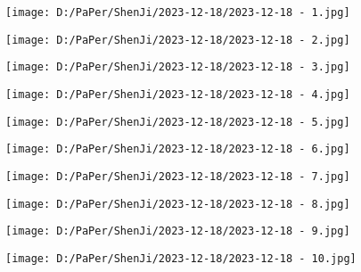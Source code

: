 \documentclass{article}
\begin{document}
\begin{figure}[h!]
	\centering
	\texttt{[image: D:/PaPer/ShenJi/2023-12-18/2023-12-18 - 1.jpg]}
\end{figure}

\begin{figure}[h!]
	\centering
	\texttt{[image: D:/PaPer/ShenJi/2023-12-18/2023-12-18 - 2.jpg]}
\end{figure}

\begin{figure}[h!]
	\centering
	\texttt{[image: D:/PaPer/ShenJi/2023-12-18/2023-12-18 - 3.jpg]}
\end{figure}

\begin{figure}[h!]
	\centering
	\texttt{[image: D:/PaPer/ShenJi/2023-12-18/2023-12-18 - 4.jpg]}
\end{figure}

\begin{figure}[h!]
	\centering
	\texttt{[image: D:/PaPer/ShenJi/2023-12-18/2023-12-18 - 5.jpg]}
\end{figure}

\begin{figure}[h!]
	\centering
	\texttt{[image: D:/PaPer/ShenJi/2023-12-18/2023-12-18 - 6.jpg]}
\end{figure}

\begin{figure}[h!]
	\centering
	\texttt{[image: D:/PaPer/ShenJi/2023-12-18/2023-12-18 - 7.jpg]}
\end{figure}

\begin{figure}[h!]
	\centering
	\texttt{[image: D:/PaPer/ShenJi/2023-12-18/2023-12-18 - 8.jpg]}
\end{figure}

\begin{figure}[h!]
	\centering
	\texttt{[image: D:/PaPer/ShenJi/2023-12-18/2023-12-18 - 9.jpg]}
\end{figure}

\begin{figure}[h!]
	\centering
	\texttt{[image: D:/PaPer/ShenJi/2023-12-18/2023-12-18 - 10.jpg]}
\end{figure}
\end{document}
